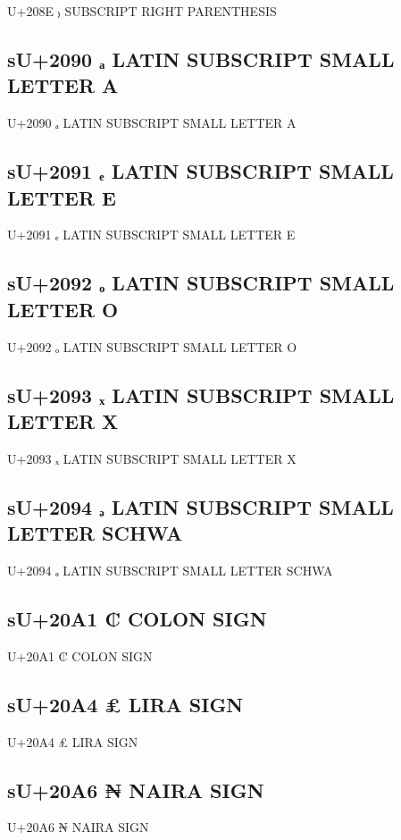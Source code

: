 U+208E ₎ SUBSCRIPT RIGHT PARENTHESIS

\subsection{sU+2090 ₐ LATIN SUBSCRIPT SMALL LETTER A}

U+2090 ₐ LATIN SUBSCRIPT SMALL LETTER A

\subsection{sU+2091 ₑ LATIN SUBSCRIPT SMALL LETTER E}

U+2091 ₑ LATIN SUBSCRIPT SMALL LETTER E

\subsection{sU+2092 ₒ LATIN SUBSCRIPT SMALL LETTER O}

U+2092 ₒ LATIN SUBSCRIPT SMALL LETTER O

\subsection{sU+2093 ₓ LATIN SUBSCRIPT SMALL LETTER X}

U+2093 ₓ LATIN SUBSCRIPT SMALL LETTER X

\subsection{sU+2094 ₔ LATIN SUBSCRIPT SMALL LETTER SCHWA}

U+2094 ₔ LATIN SUBSCRIPT SMALL LETTER SCHWA

\subsection{sU+20A1 ₡  COLON SIGN}

U+20A1 ₡  COLON SIGN

\subsection{sU+20A4 ₤  LIRA SIGN}

U+20A4 ₤  LIRA SIGN

\subsection{sU+20A6 ₦  NAIRA SIGN}

U+20A6 ₦  NAIRA SIGN


